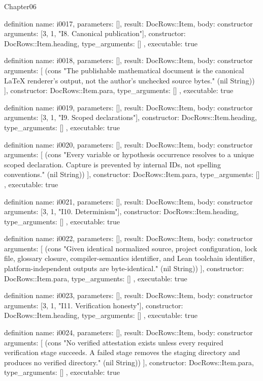\begin{lexlean}{Chapter06}
\begin{semanticmodule}
definition{
  name: i0017,
  parameters: [],
  result: DocRows::Item,
  body: constructor{
    arguments: [3, 1, "I8. Canonical publication"],
    constructor: DocRows::Item.heading,
    type_arguments: []
  },
  executable: true
}

definition{
  name: i0018,
  parameters: [],
  result: DocRows::Item,
  body: constructor{
    arguments: [
      (cons "The publishable mathematical document is the canonical LaTeX renderer's output, not the author's unchecked source bytes." (nil String))
    ],
    constructor: DocRows::Item.para,
    type_arguments: []
  },
  executable: true
}

definition{
  name: i0019,
  parameters: [],
  result: DocRows::Item,
  body: constructor{
    arguments: [3, 1, "I9. Scoped declarations"],
    constructor: DocRows::Item.heading,
    type_arguments: []
  },
  executable: true
}

definition{
  name: i0020,
  parameters: [],
  result: DocRows::Item,
  body: constructor{
    arguments: [
      (cons "Every variable or hypothesis occurrence resolves to a unique scoped declaration. Capture is prevented by internal IDs, not spelling conventions." (nil String))
    ],
    constructor: DocRows::Item.para,
    type_arguments: []
  },
  executable: true
}

definition{
  name: i0021,
  parameters: [],
  result: DocRows::Item,
  body: constructor{
    arguments: [3, 1, "I10. Determinism"],
    constructor: DocRows::Item.heading,
    type_arguments: []
  },
  executable: true
}

definition{
  name: i0022,
  parameters: [],
  result: DocRows::Item,
  body: constructor{
    arguments: [
      (cons "Given identical normalized source, project configuration, lock file, glossary closure, compiler-semantics identifier, and Lean toolchain identifier, platform-independent outputs are byte-identical." (nil String))
    ],
    constructor: DocRows::Item.para,
    type_arguments: []
  },
  executable: true
}

definition{
  name: i0023,
  parameters: [],
  result: DocRows::Item,
  body: constructor{
    arguments: [3, 1, "I11. Verification honesty"],
    constructor: DocRows::Item.heading,
    type_arguments: []
  },
  executable: true
}

definition{
  name: i0024,
  parameters: [],
  result: DocRows::Item,
  body: constructor{
    arguments: [
      (cons "No verified attestation exists unless every required verification stage succeeds. A failed stage removes the staging directory and produces no verified directory." (nil String))
    ],
    constructor: DocRows::Item.para,
    type_arguments: []
  },
  executable: true
}


\end{semanticmodule}
\end{lexlean}

